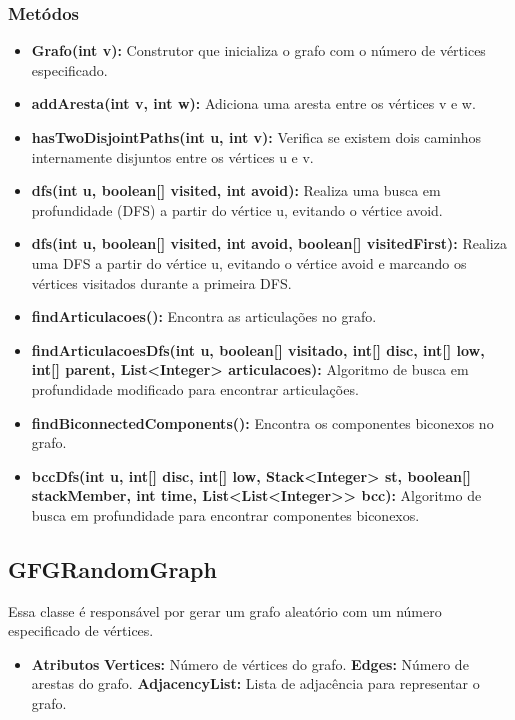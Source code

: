 \subsubsection{Metódos}
\begin{itemize}
    \item \textbf{Grafo(int v):} Construtor que inicializa o grafo com o número de vértices especificado.
    \item \textbf{addAresta(int v, int w):} Adiciona uma aresta entre os vértices v e w.
    \item \textbf{hasTwoDisjointPaths(int u, int v):} Verifica se existem dois caminhos internamente disjuntos entre os vértices u e v.
    \item \textbf{dfs(int u, boolean[] visited, int avoid):} Realiza uma busca em profundidade (DFS) a partir do vértice u, evitando o vértice avoid.
    \item \textbf{dfs(int u, boolean[] visited, int avoid, boolean[] visitedFirst):} Realiza uma DFS a partir do vértice u, evitando o vértice avoid e marcando os vértices visitados durante a primeira DFS.
    \item \textbf{findArticulacoes():} Encontra as articulações no grafo.
    \item \textbf{findArticulacoesDfs(int u, boolean[] visitado, int[] disc, int[] low, int[] parent, List<Integer> articulacoes):} Algoritmo de busca em profundidade modificado para encontrar articulações.
    \item \textbf{findBiconnectedComponents():} Encontra os componentes biconexos no grafo.
    \item \textbf{bccDfs(int u, int[] disc, int[] low, Stack<Integer> st, boolean[] stackMember, int time, List<List<Integer>> bcc):} Algoritmo de busca em profundidade para encontrar componentes biconexos.
\end{itemize}  

\subsection{GFGRandomGraph}
Essa classe é responsável por gerar um grafo aleatório com um número especificado de vértices.

\begin{itemize}
    \item \textbf{Atributos} 
    \subitem \textbf{Vertices:} Número de vértices do grafo.
    \subitem \textbf{Edges:} Número de arestas do grafo.
    \subitem \textbf{AdjacencyList:} Lista de adjacência para representar o grafo.
\end{itemize}  


